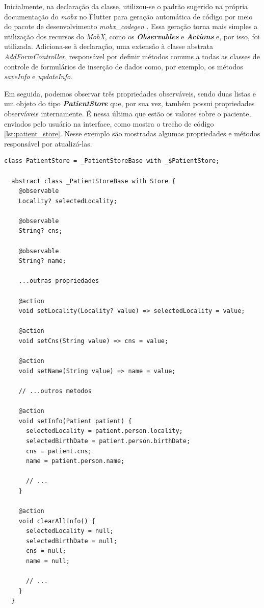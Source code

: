 Inicialmente, na declaração da classe, utilizou-se o padrão sugerido na própria documentação do \textit{mobx} no Flutter para geração automática de código por meio do pacote de desenvolvimento \textit{mobx\_codegen} \cite{mobx_core_concepts}. Essa geração torna mais simples a utilização dos recursos do \textit{MobX}, como os \textit{\textbf{Observables}} e \textit{\textbf{Actions}} e, por isso, foi utilizada. Adiciona-se à declaração, uma extensão à classe abstrata \textit{AddFormController}, responsável por definir métodos comuns a todas as classes de controle de formulários de inserção de dados como, por exemplo, os métodos \textit{saveInfo} e \textit{updateInfo}.

Em seguida, podemos observar três propriedades observáveis, sendo duas listas e um objeto do tipo \textbf{\textit{PatientStore}} que, por sua vez, também possui propriedades observáveis internamente. É nessa última que estão os valores sobre o paciente, enviados pelo usuário na interface, como mostra o trecho de código \ref{lst:patient_store}. Nesse exemplo são mostradas algumas propriedades e métodos responsável por atualizá-las.

\begin{lstlisting}[caption={Trechos da classe \textit{PatientStore}}, label={lst:patient_store}]
  class PatientStore = _PatientStoreBase with _$PatientStore;

  abstract class _PatientStoreBase with Store {
    @observable
    Locality? selectedLocality;

    @observable
    String? cns;
  
    @observable
    String? name;

    ...outras propriedades

    @action
    void setLocality(Locality? value) => selectedLocality = value;
  
    @action
    void setCns(String value) => cns = value;
  
    @action
    void setName(String value) => name = value;
  
    // ...outros metodos
  
    @action
    void setInfo(Patient patient) {
      selectedLocality = patient.person.locality;
      selectedBirthDate = patient.person.birthDate;
      cns = patient.cns;
      name = patient.person.name;

      // ...
    }
  
    @action
    void clearAllInfo() {
      selectedLocality = null;
      selectedBirthDate = null;
      cns = null;
      name = null;

      // ...
    }
  }
  
\end{lstlisting}

